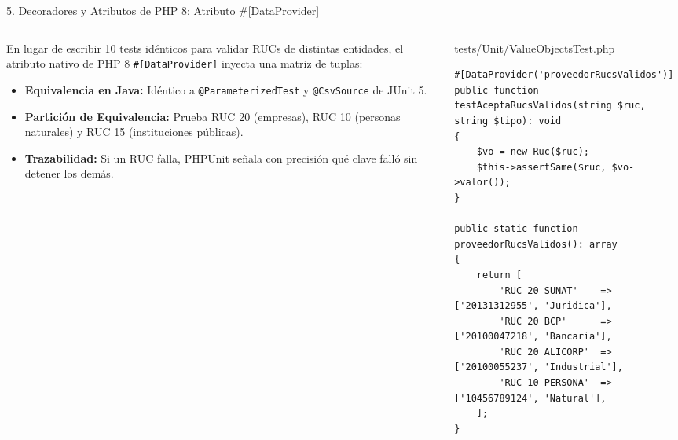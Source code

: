 \documentclass[aspectratio=169,10pt]{beamer}
\begin{document}
\begin{frame}[fragile]{5. Decoradores y Atributos de PHP 8: Atributo \#[DataProvider]}
\begin{columns}
\begin{column}{0.48\textwidth}
    \begin{tcolorbox}[colback=cardbg, colframe=cardbg, title=\color{accentblue}\bfseries Pruebas Parametrizadas (Cero Código DRY)]
        En lugar de escribir 10 tests idénticos para validar RUCs de distintas entidades, el atributo nativo de PHP 8 \texttt{\#[DataProvider]} inyecta una matriz de tuplas:
        \begin{itemize}
            \item \textbf{Equivalencia en Java:} Idéntico a \texttt{@ParameterizedTest} y \texttt{@CsvSource} de JUnit 5.
            \item \textbf{Partición de Equivalencia:} Prueba RUC 20 (empresas), RUC 10 (personas naturales) y RUC 15 (instituciones públicas).
            \item \textbf{Trazabilidad:} Si un RUC falla, PHPUnit señala con precisión qué clave falló sin detener los demás.
        \end{itemize}
    \end{tcolorbox}
\end{column}
\begin{column}{0.52\textwidth}
    \begin{codebox}{tests/Unit/ValueObjectsTest.php}
\begin{lstlisting}
#[DataProvider('proveedorRucsValidos')]
public function testAceptaRucsValidos(string $ruc, string $tipo): void 
{
    $vo = new Ruc($ruc);
    $this->assertSame($ruc, $vo->valor());
}

public static function proveedorRucsValidos(): array 
{
    return [
        'RUC 20 SUNAT'    => ['20131312955', 'Juridica'],
        'RUC 20 BCP'      => ['20100047218', 'Bancaria'],
        'RUC 20 ALICORP'  => ['20100055237', 'Industrial'],
        'RUC 10 PERSONA'  => ['10456789124', 'Natural'],
    ];
}
\end{lstlisting}
    \end{codebox}
\end{column}
\end{columns}
\end{frame}
\end{document}
